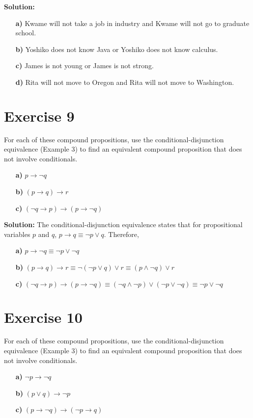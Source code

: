 \documentclass{Axon}
\begin{document}
\noindent
\textbf{Solution:}
\begin{enumerate}
    \item[\textbf{a)}] Kwame will not take a job in industry and Kwame will not go to graduate school.
    \item[\textbf{b)}] Yoshiko does not know Java or Yoshiko does not know calculus.
    \item[\textbf{c)}] James is not young or James is not strong.
    \item[\textbf{d)}] Rita will not move to Oregon and Rita will not move to Washington.
\end{enumerate}

\section*{Exercise 9}
For each of these compound propositions, use the conditional-disjunction equivalence (Example 3) to find an equivalent compound proposition that does not involve conditionals.
\begin{enumerate}
    \item[\textbf{a)}] \(p \to \lnot q\)
    \item[\textbf{b)}] \((p \to q) \to r\)
    \item[\textbf{c)}] \((\lnot q \to p) \to (p \to \lnot q)\)
\end{enumerate}

\noindent
\textbf{Solution:}
The conditional-disjunction equivalence states that for propositional variables \(p\) and \(q\), \(p \to q \equiv \lnot p \lor q\). Therefore,
\begin{enumerate}
    \item[\textbf{a)}] \(p \to \lnot q \equiv \lnot p \lor \lnot q\)
    \item[\textbf{b)}] \((p \to q) \to r \equiv \lnot(\lnot p \lor q) \lor r \equiv (p \land \lnot q) \lor r\)
    \item[\textbf{c)}] \((\lnot q \to p) \to (p \to \lnot q) \equiv (\lnot q \land \lnot p) \lor (\lnot p \lor \lnot q) \equiv \lnot p \lor \lnot q\)
\end{enumerate}

\section*{Exercise 10}
For each of these compound propositions, use the conditional-disjunction equivalence (Example 3) to find an equivalent compound proposition that does not involve conditionals.
\begin{enumerate}
    \item[\textbf{a)}] \(\lnot p \to \lnot q\)
    \item[\textbf{b)}] \((p \lor q) \to \lnot p\)
    \item[\textbf{c)}] \((p \to \lnot q) \to (\lnot p \to q)\)
\end{enumerate}
\end{document}
